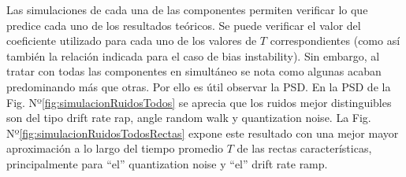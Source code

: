 \documentclass[a4paper,11pt,twoside]{IT-CNEA}
\begin{document}
\par Las simulaciones de cada una de las componentes permiten verificar lo que predice cada uno de los resultados teóricos. Se puede verificar el valor del coeficiente utilizado para cada uno de los valores de $T$ correspondientes  (como así también la relación indicada para el caso de bias instability). Sin embargo, al tratar con todas las componentes en simultáneo se nota como algunas acaban predominando más que otras. Por ello es útil observar la PSD. En la PSD de la Fig. Nº\ref{fig:simulacionRuidosTodos} se aprecia que los ruidos mejor distinguibles son del tipo drift rate rap, angle random walk y quantization noise. La Fig. Nº\ref{fig:simulacionRuidosTodosRectas} expone este resultado con una mejor mayor aproximación  a lo largo del tiempo promedio $T$ de las rectas características, principalmente para ``el'' quantization noise y ``el'' drift rate ramp.
\end{document}

